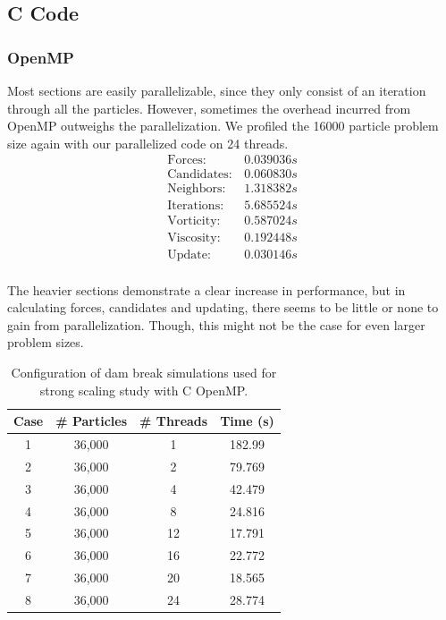 \documentclass{scrartcl}
\begin{document}
    \subsection{C Code}  
    \subsubsection{OpenMP}
    
    Most sections are easily parallelizable, since they only consist of an iteration through all the particles. However, sometimes the overhead incurred from OpenMP outweighs the parallelization. We profiled the 16000 particle problem size again with our parallelized code on 24 threads.
    \[\begin{array}{lc}
    \mathrm{Forces:}     & 0.039036 s \\
    \mathrm{Candidates:} & 0.060830 s \\
    \mathrm{Neighbors:}  & 1.318382 s \\
    \mathrm{Iterations:} & 5.685524 s \\
    \mathrm{Vorticity:}  & 0.587024 s \\
    \mathrm{Viscosity:}  & 0.192448 s \\
    \mathrm{Update:}     & 0.030146 s \\
    \end{array}\]
    
    The heavier sections demonstrate a clear increase in performance, but in calculating forces, candidates and updating, there seems to be little or none to gain from parallelization. Though, this might not be the case for even larger problem sizes.
    \begin{table}[h!]
    	\begin{center}
    		\begin{tabular}{| c | c | c | c |}
    			\hline
    			Case & \# Particles & \# Threads & Time (s) \\ \hline		  		
    			1 & 36,000 &  1 & 182.99 \\ \hline		  		
    			2 & 36,000 &  2 & 79.769 \\ \hline		  		
    			3 & 36,000 &  4 & 42.479 \\ \hline		  		
    			4 & 36,000 &  8 & 24.816 \\ \hline		  		
    			5 & 36,000 & 12 & 17.791 \\ \hline		  		
    			6 & 36,000 & 16 & 22.772 \\ \hline		  		
    			7 & 36,000 & 20 & 18.565 \\ \hline		  		
    			8 & 36,000 & 24 & 28.774 \\ \hline		  		
    		\end{tabular}
    		\caption{Configuration of dam break simulations used for strong scaling study with C OpenMP.}
    		\label{tab:css}
    	\end{center}
    \end{table}
    
\end{document}
